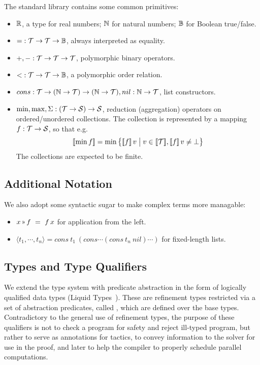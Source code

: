 The standard library contains some common primitives:

\begin{itemize}
  \item $\mathbb{R}$, a type for real numbers; $\mathbb{N}$ for natural numbers; $\mathbb{B}$ for Boolean true/false.
  \item ${=} : \mathcal{T}\to\mathcal{T}\to\mathbb{B}$, always interpreted as equality.
  \item ${+}, {-} : \mathcal{T}\to\mathcal{T}\to\mathcal{T}$, polymorphic binary operators.
  \item ${<} : \mathcal{T}\to\mathcal{T}\to\mathbb{B}$, a polymorphic order relation.
  \item $cons : \mathcal{T}\to(\mathbb{N}\to\mathcal{T})\to(\mathbb{N}\to\mathcal{T}), nil : \mathbb{N}\to\mathcal{T}$, list constructors.
  \item $\min, \max, \Sigma : (\mathcal{T}\to\mathcal{S})\to\mathcal{S}$, reduction (aggregation) operators
    on ordered/unordered collections. The collection is represented by a mapping $f : \mathcal{T}\to\mathcal{S}$,
    so that e.g. \[\semp{\min f} = \min \big\{\semp{f}\,v \;\big|\; v\in\semp{\T}, \semp{f}\,v\neq\bot\big\}\]
    The collections are expected to be finite.
\end{itemize}

\subsection{Additional Notation}
\newcommand\applt{\textrm{{\scriptsize\,}\guillemotright{\scriptsize\,}}}

We also adopt some syntactic sugar to make complex terms more managable:

\begin{itemize}
  \item $x \applt f ~=~ f\,x$ for application from the left.
  \item $\langle t_1,\cdots,t_n\rangle = cons~t_1 ~ (cons \cdots (cons~t_n ~ nil) \cdots)$
    for fixed-length lists.
\end{itemize}

\subsection{Types and Type Qualifiers}

We extend the type system with predicate abstraction in the form of logically qualified data types 
(Liquid Types~\cite{PLDI08/Rondon}). These are refinement types restricted via a set of abstraction predicates,
called , which are defined over the base types.
Contradictory to the general use of refinement types, the purpose of these qualifiers is not to
check a program for safety and reject ill-typed program, but rather to serve as annotations for
tactics, to convey information to the solver for use in the proof, and later to help the compiler
to properly schedule parallel computations.

